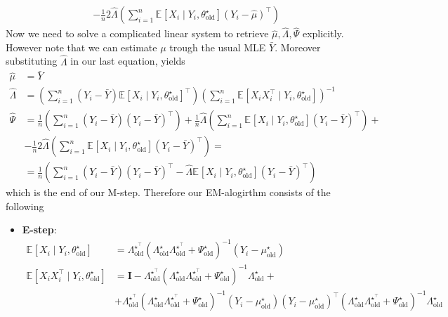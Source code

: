 \documentclass[10pt,notitlepage]{article}
\newcommand{\mean}[2][]{\mathbb{E}_{#1}\left[#2\right]}
\newcommand{\Id}{\mathbf{I}}
\begin{document}
\begin{exercise}[Solution]
\begin{align*}
            &- \frac{1}{n} 2 \hat{\Lambda} \left(\sum_{i=1}^{n}\mean{X_i\mid Y_i, \theta^\star_{\text{old}}}\left(Y_i-\hat{\mu}\right)^\top\right)
        \end{align*}
        Now we need to solve a complicated linear system to retrieve $\hat{\mu},\hat{\Lambda},\hat{\Psi}$ explicitly. \\
        However note that we can estimate $\mu$ trough the usual MLE $\bar{Y}$. Moreover substituting $\hat{\Lambda}$ in our last equation, yields
        \begin{align*}
            \hat{\mu} &= \bar{Y}\\
            \hat{\Lambda}&=\left(\sum_{i=1}^{n}\left(Y_i-\bar{Y}\right)\mean{X_i\mid Y_i, \theta^\star_{\text{old}}}^\top\right)\left(\sum_{i=1}^{n}\mean{X_i X_i^\top\mid Y_i, \theta^\star_{\text{old}}}\right)^{-1}\\
            \hat{\Psi} &= \frac{1}{n}\left(\sum_{i=1}^{n}\left(Y_i-\bar{Y}\right)\left(Y_i-\bar{Y}\right)^\top\right) + \frac{1}{n}\hat{\Lambda}\left(\sum_{i=1}^{n}\mean{X_i\mid Y_i, \theta^\star_{\text{old}}}\left(Y_i-\bar{Y}\right)^\top\right) +\\
            &- \frac{1}{n} 2 \hat{\Lambda} \left(\sum_{i=1}^{n}\mean{X_i\mid Y_i, \theta^\star_{\text{old}}}\left(Y_i-\bar{Y}\right)^\top\right) = \\
            &= \frac{1}{n}\left(\sum_{i=1}^{n}\left(Y_i-\bar{Y}\right)\left(Y_i-\bar{Y}\right)^\top - \hat{\Lambda}\mean{X_i\mid Y_i, \theta^\star_{\text{old}}}\left(Y_i-\bar{Y}\right)^\top\right)
        \end{align*}
        which is the end of our M-step.
        Therefore our EM-alogirthm consists of the following
        \begin{itemize}
            \item \textbf{E-step}:
                    \begin{align*}
                        \mean{X_i\mid Y_i, \theta^\star_{\text{old}}} &= \Lambda^{\star^\top}_{\text{old}}\left(\Lambda^\star_{\text{old}}\Lambda^{\star^\top}_{\text{old}}+\Psi^\star_{\text{old}}\right)^{-1}\left(Y_i-\mu^\star_{\text{old}}\right)\\
                        \mean{X_i X_i^\top\mid Y_i, \theta^\star_{\text{old}}} &= \Id-\Lambda^{\star^\top}_{\text{old}}\left(\Lambda^\star_{\text{old}}\Lambda^{\star^\top}_{\text{old}}+\Psi^\star_{\text{old}}\right)^{-1}\Lambda^\star_{\text{old}} + \\
                        &+\Lambda^{\star^\top}_{\text{old}}\left(\Lambda^\star_{\text{old}}\Lambda^{\star^\top}_{\text{old}}+\Psi^\star_{\text{old}}\right)^{-1}\left(Y_i-\mu^\star_{\text{old}}\right) \left(Y_i-\mu^\star_{\text{old}}\right)^\top \left(\Lambda^\star_{\text{old}}\Lambda^{\star^\top}_{\text{old}}+\Psi^\star_{\text{old}}\right)^{-1}\Lambda^{\star}_{\text{old}}

\end{align*}
\end{itemize}
\end{exercise}
\end{document}

